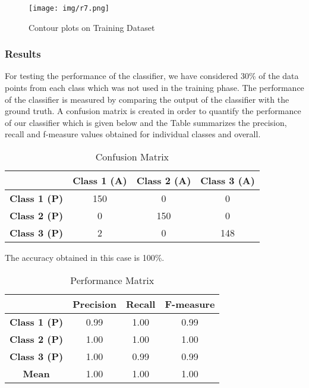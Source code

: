 \begin{figure}[H]
     \centering
     \texttt{[image: img/r7.png]}
     \caption{Contour plots on Training Dataset}
     \label{fig:Figure8}
\end{figure}

\subsubsection{Results}
For testing the performance of the classifier, we have considered 30\% of the data points from each class which was not used in the training phase. The performance of the classifier is measured by comparing the output of the classifier with the ground truth. A confusion matrix is created in order to quantify the performance of our classifier which is given below and the Table summarizes
the precision, recall and f-measure values obtained for individual classes and overall.\\

\begin{table}[H]
\centering
\begin{tabular}{|c|c|c|c|}
\hline
\ & \textbf{Class 1 (A)} & \textbf{Class 2 (A)} & \textbf{Class 3 (A)}\\
\hline
\textbf{Class 1 (P)} & 150 & 0 & 0 \\
\hline 
\textbf{Class 2 (P)} & 0 & 150 & 0 \\
\hline
\textbf{Class 3 (P)} & 2 & 0 & 148 \\
\hline
\end{tabular}
\caption{Confusion Matrix}
\label{tab:Table8}
\end{table}

The accuracy obtained in this case is 100\%.\\

\begin{table}[H]
\centering
\begin{tabular}{|c|c|c|c|}
\hline
\ & \textbf{Precision} & \textbf{Recall} & \textbf{F-measure}\\
\hline
\textbf{Class 1 (P)} & 0.99 & 1.00 & 0.99 \\
\hline 
\textbf{Class 2 (P)} & 1.00 & 1.00 & 1.00 \\
\hline
\textbf{Class 3 (P)} & 1.00 & 0.99 & 0.99 \\
\hline
\textbf{Mean} & 1.00 & 1.00 & 1.00 \\
\hline
\end{tabular}
\caption{Performance Matrix}
\label{tab:Table9}
\end{table}


